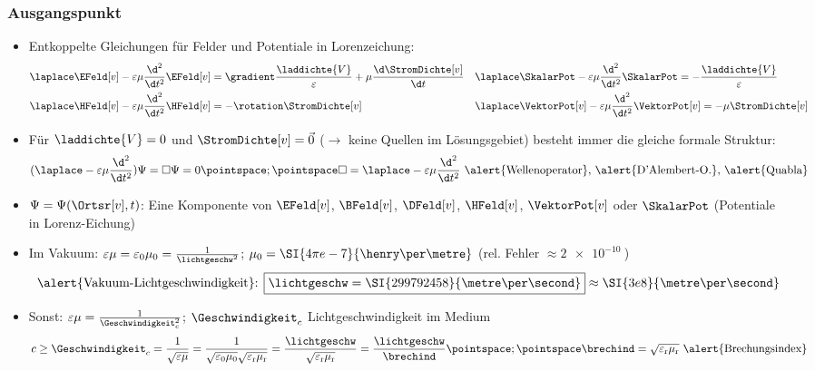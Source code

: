 \begin{frame}
  \frametitle{Ausgangspunkt}
  \begin{itemize}[<+->]
  \item Entkoppelte Gleichungen für Felder und Potentiale in \alert{Lorenzeichung}:
    \begin{align*}
      \laplace \EFeld[v]-\varepsilon\mu \frac{\d^2}{\d t^2}\EFeld[v] &= \gradient \frac{\laddichte{V}}{\varepsilon}+\mu \frac{\d \StromDichte[v]}{\d t} && \laplace\SkalarPot-\varepsilon\mu \frac{\d^2}{\d t^2}\SkalarPot = -\frac{\laddichte{V}}{\varepsilon}\\
      \laplace\HFeld[v]-\varepsilon\mu\frac{\d^2}{\d t^2}\HFeld[v]& = -\rotation\StromDichte[v] && \laplace\VektorPot[v]-\varepsilon\mu \frac{\d^2}{\d t^2}\VektorPot[v] = -\mu \StromDichte[v]
      \end{align*}
  \item Für \(\laddichte{V}=0\) und \(\StromDichte[v]=\vec{0}\) (\(\rightarrow\) keine Quellen im Lösungsgebiet) besteht immer die gleiche formale Struktur:
\begin{equation*}
(\laplace -\varepsilon\mu\frac{\d^2}{\d t^2})\Psi = \square\Psi = 0\pointspace ; \pointspace \square = \laplace - \varepsilon\mu\frac{\d^2}{\d t^2} \text{ \alert{Wellenoperator}, \alert{D'Alembert-O.}, \alert{Quabla}} 
\end{equation*}    
\item   \(\Psi = \Psi(\Ortsr[v], t)\): Eine Komponente von \(\EFeld[v]\), \(\BFeld[v]\), \(\DFeld[v]\), \(\HFeld[v]\), \(\VektorPot[v]\) oder \(\SkalarPot\) (Potentiale in Lorenz-Eichung)
\item Im Vakuum: \(\varepsilon\mu = \varepsilon_0 \mu_0 = \frac{1}{\lichtgeschw^2}\); \(\mu_0 = \SI{4\pi e-7}{\henry\per\metre}\) (rel. Fehler \(\approx \SI{2e-10}{}\))
 \begin{equation*}
 \text{\alert{Vakuum-Lichtgeschwindigkeit}: }\boxed{\lichtgeschw = \SI{299792458}{\metre\per\second}} \approx \SI{3e8}{\metre\per\second}
\end{equation*}
\item Sonst: \(\varepsilon\mu = \frac{1}{\Geschwindigkeit_{c}^2}\); \(\Geschwindigkeit_{c}\) Lichtgeschwindigkeit im Medium
 \begin{equation*}
c\ge \Geschwindigkeit_{c} = \frac{1}{\sqrt{\varepsilon\mu}} = \frac{1}{\sqrt{\varepsilon_0\mu_0}\sqrt{\varepsilon_\mathrm{r}\mu_\mathrm{r}}} = \frac{\lichtgeschw}{\sqrt{\varepsilon_\mathrm{r}\mu_\mathrm{r}}} =\frac{\lichtgeschw}{\brechind} \pointspace ; \pointspace \brechind = \sqrt{\varepsilon_\mathrm{r}\mu_\mathrm{r}} \text{ \alert{Brechungsindex}}
\end{equation*}
  \end{itemize}
\end{frame}


